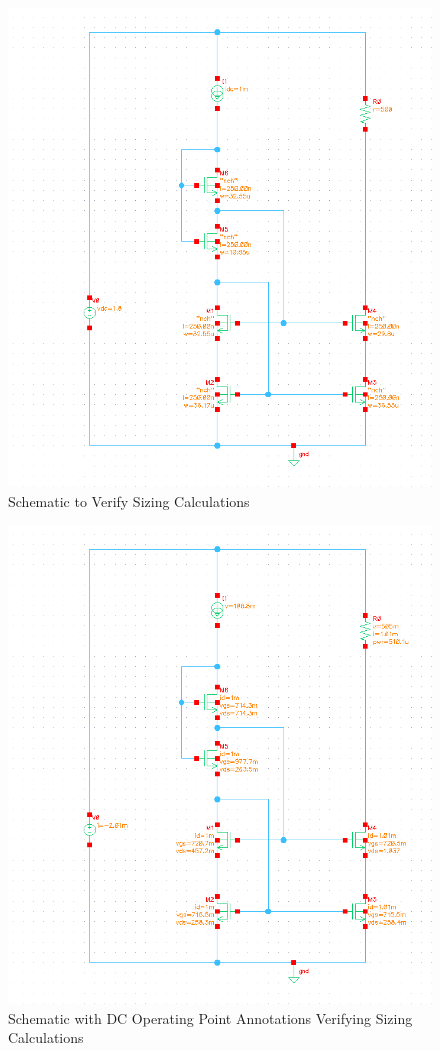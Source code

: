 \documentclass{article}
\begin{document}
\begin{figure}[H]
\centering
\includegraphics[width=6in]{p2_5_schem.png}
\caption{Schematic to Verify Sizing Calculations}
\label{2_5_schem}
\end{figure}


\begin{figure}[H]
\centering
\includegraphics[width=6in]{p2_5_dcop.png}
\caption{Schematic with DC Operating Point Annotations Verifying Sizing Calculations}
\label{2_5_dcop}
\end{figure}
\newpage
\end{document}
